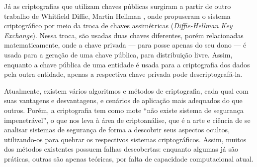 Já as criptografias que utilizam chaves públicas surgiram a partir de outro trabalho de
Whitfield Diffie, Martin Hellman \cite{artigo:diffiehellman-public}, onde propuseram
o sistema criptográfico por meio da troca de chaves assimétricas (\emph{Diffie-Hellman
Key Exchange}). Nessa troca, são usadas duas chaves diferentes, porém relacionadas
matematicamente, onde a chave privada --- para posse apenas do seu dono --- é usada
para a geração de uma chave pública, para distribuição livre. Assim, enquanto a chave
pública de uma entidade é usada para a criptografia dos dados pela outra entidade,
apenas a respectiva chave privada pode descriptografá-la.

Atualmente, existem vários algoritmos e métodos de criptografia, cada qual com suas
vantagens e desvantagens, e cenários de aplicação mais adequados do que outros. Porém,
a criptografia tem como mote ``não existe sistema de segurança impenetrável'', o que nos
leva à área de criptoanálise, que é a arte e ciência de se analisar sistemas de
segurança de forma a descobrir seus aspectos ocultos, utilizando-os para quebrar os
respectivos sistemas criptográficos. Assim, muitos dos métodos existentes possuem falhas
descobertas: enquanto algumas já são práticas, outras são apenas teóricas, por falta de
capacidade computacional atual.





